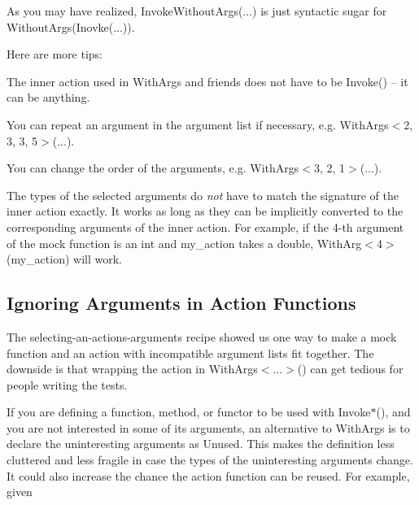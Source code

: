 As you may have realized, {\ttfamily Invoke\+Without\+Args(...)} is just syntactic sugar for {\ttfamily Without\+Args(\+Inovke(...))}.

Here are more tips\+:


\begin{DoxyItemize}
\item The inner action used in {\ttfamily With\+Args} and friends does not have to be {\ttfamily Invoke()} -- it can be anything.
\item You can repeat an argument in the argument list if necessary, e.\+g. {\ttfamily With\+Args$<$2, 3, 3, 5$>$(...)}.
\item You can change the order of the arguments, e.\+g. {\ttfamily With\+Args$<$3, 2, 1$>$(...)}.
\item The types of the selected arguments do {\itshape not} have to match the signature of the inner action exactly. It works as long as they can be implicitly converted to the corresponding arguments of the inner action. For example, if the 4-\/th argument of the mock function is an {\ttfamily int} and {\ttfamily my\+\_\+action} takes a {\ttfamily double}, {\ttfamily With\+Arg$<$4$>$(my\+\_\+action)} will work.
\end{DoxyItemize}

\subsection*{Ignoring Arguments in Action Functions}

The selecting-\/an-\/action\textquotesingle{}s-\/arguments recipe showed us one way to make a mock function and an action with incompatible argument lists fit together. The downside is that wrapping the action in {\ttfamily With\+Args$<$...$>$()} can get tedious for people writing the tests.

If you are defining a function, method, or functor to be used with {\ttfamily Invoke$\ast$()}, and you are not interested in some of its arguments, an alternative to {\ttfamily With\+Args} is to declare the uninteresting arguments as {\ttfamily Unused}. This makes the definition less cluttered and less fragile in case the types of the uninteresting arguments change. It could also increase the chance the action function can be reused. For example, given


\begin{DoxyCode}{0}
\end{DoxyCode}


